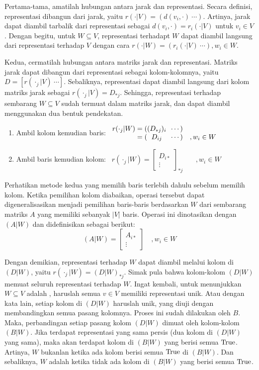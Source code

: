 Pertama-tama, amatilah hubungan antara jarak dan representasi. Secara definisi, representasi dibangun dari jarak, yaitu \(r(\cdot|V)=(d(v_i,\cdot)\ \cdots)\). Artinya, jarak dapat diambil tarbalik dari representasi sebagai \(d(v_i,\cdot) = r_i(\cdot|V)\) untuk \(v_i \in V\). Dengan begitu, untuk \(W \subseteq V\), representasi terhadapt \(W\) dapat diambil langsung dari representasi terhadap \(V\) dengan cara \(r(\cdot|W) = (r_i(\cdot|V)\ \cdots), w_i \in W\).

Kedua, cermatilah hubungan antara matriks jarak dan representasi. Matriks jarak dapat dibangun dari representasi sebagai kolom-kolomnya, yaitu \(D = [r(\cdot_j|V)\ \cdots]\). Sebaliknya, representasi dapat diambil langsung dari kolom matriks jarak sebagai \(r(\cdot_j|V) = D_{*j}\). Sehingga, representasi terhadap sembarang \(W \subseteq V\) sudah termuat dalam matriks jarak, dan dapat diambil menggunakan dua bentuk pendekatan.
\begin{enumerate}
	\item Ambil kolom kemudian baris:
		\(
		\begin{array}{r@{}c@{\ }l}
			r(\cdot_j|W) = (&(D_{*j})_i&\ \cdots) \\
			= (&D_{ij}&\ \cdots) \quad, w_i \in W
		\end{array}
		\)
	\item Ambil baris kemudian kolom:
		\, \( r(\cdot_j|W) = \left[ \begin{array}{c} D_{i*}\\ \vdots \end{array} \right]_{\displaystyle *j} \;\;\;\quad, w_i \in W \)
\end{enumerate}

Perhatikan metode  kedua yang memilih baris terlebih dahulu sebelum memilih kolom. Ketika pemilihan kolom diabaikan, operasi tersebut dapat digeneralisasikan menjadi pemilihan baris-baris berdasarkan \(W\) dari sembarang matriks \(A\) yang memiliki sebanyak \(|V|\) baris. Operasi ini dinotasikan dengan \((A|W)\) dan didefinisikan sebagai berikut:
	\[ (A|W) = \left[ \begin{array}{c} A_{i*}\\ \vdots \end{array} \right] \quad, w_i \in W \]

Dengan demikian, representasi terhadap \(W\) dapat diambil melalui kolom di \((D|W)\), yaitu \(r(\cdot_j|W) = (D|W)_{*j}\). Simak pula bahwa kolom-kolom \((D|W)\) memuat seluruh representasi terhadap \(W\). Ingat kembali, untuk menunjukkan \(W \subseteq V\) adalah , haruslah semua \(v \in V\) memiliki representasi unik. Atau dengan kata lain, setiap kolom di \((D|W)\) haruslah unik, yang diuji dengan membandingkan semua pasang kolomnya. Proses ini sudah dilakukan oleh  \(B\). Maka, perbandingan setiap pasang kolom \((D|W)\) dimuat oleh kolom-kolom \((B|W)\). Jika terdapat representasi yang sama persis (dua kolom di \((D|W)\) yang sama), maka akan terdapat kolom di \((B|W)\) yang berisi semua \(\mathrm{True}\). Artinya, \(W\) bukanlan  ketika ada kolom berisi semua \(\mathrm{True}\) di \((B|W)\). Dan sebaliknya, \(W\) adalah  ketika tidak ada kolom di \((B|W)\) yang berisi semua \(\mathrm{True}\).

